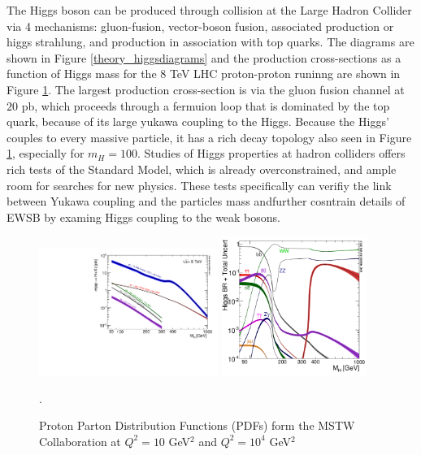 The Higgs boson can be produced through collision at the Large Hadron Collider
via 4 mechanisms: gluon-fusion, vector-boson fusion, associated production or
higgs strahlung, and production in association with top quarks. The diagrams
are shown in Figure \ref{theory_higgsdiagrams} and the production
cross-sections as a function of Higgs mass for the 8 TeV LHC proton-proton
runinng are shown in Figure \ref{figure:theory_xsec}. The largest production
cross-section is via the gluon fusion channel at ~$20$ pb, which proceeds
through a fermuion loop that is dominated by the top quark, because of its
large yukawa coupling to the Higgs. Because the Higgs' couples to every massive
particle, it has a rich decay topology also seen in Figure
\ref{figure:theory_xsec}, especially for $m_H=100$.  Studies of Higgs
properties at hadron colliders offers rich tests of the Standard Model, which
is already overconstrained, and ample room for searches for new physics. These
tests specifically can verifiy the link between Yukawa coupling and the
particles mass andfurther cosntrain details of EWSB by examing Higgs coupling
to the weak bosons. 

\begin{figure}[!t]
\centering 
\includegraphics[width=0.52\textwidth]{figs/Higgs_XS_8TeV_lx.pdf}
\includegraphics[width=0.42\textwidth]{figs/Higgs_BR.pdf}
\caption {Proton Parton Distribution Functions (PDFs) form the MSTW Collaboration at $Q^2 = 10$ GeV$^2$ and $Q^2 = 10^4$ GeV$^2$}.
\label{figure:theory_xsec}
\end{figure}


